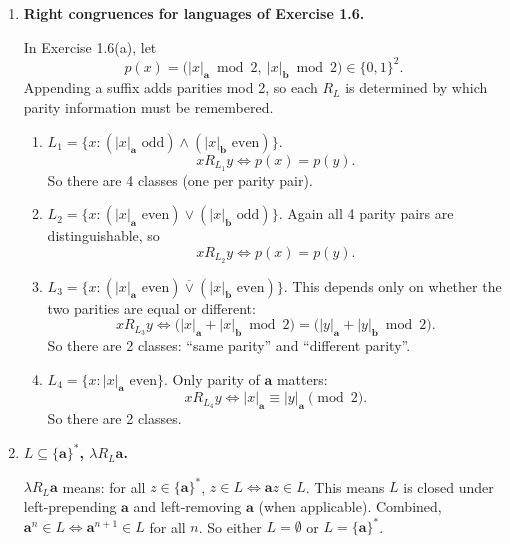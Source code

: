 \begin{enumerate}[{2.}1.]
Let the four $R^N$-classes from Example 2.6 be
\[
A_0=[\lambda],\quad A_1=[\mathbf{1}],\quad A_2=[\mathbf{11}],\quad A_3=[\mathbf{000}].
\]
Not every union of these classes preserves $R_L=R^N$; many choices collapse states.
The unions that keep all four classes pairwise Nerode-distinct are exactly:
\[
L=A_0\cup A_1,\quad
L=A_1\cup A_2,\quad
L=A_0\cup A_3,\quad
L=A_2\cup A_3.
\]
These are precisely the languages with $R_L=R^N$.

\item \textbf{Right congruences for languages of Exercise 1.6.}

In Exercise 1.6(a), let
\[
p(x)=\bigl(|x|_\mathbf a \bmod 2,\ |x|_\mathbf b \bmod 2\bigr)\in\{0,1\}^2.
\]
Appending a suffix adds parities mod 2, so each $R_L$ is determined by which
parity information must be remembered.

\begin{enumerate}
\item $L_1=\{x:(|x|_\mathbf a\text{ odd})\wedge(|x|_\mathbf b\text{ even})\}$.
\[
x R_{L_1} y \Longleftrightarrow p(x)=p(y).
\]
So there are 4 classes (one per parity pair).

\item $L_2=\{x:(|x|_\mathbf a\text{ even})\vee(|x|_\mathbf b\text{ odd})\}$.
Again all 4 parity pairs are distinguishable, so
\[
x R_{L_2} y \Longleftrightarrow p(x)=p(y).
\]

\item $L_3=\{x:(|x|_\mathbf a\text{ even})\overline{\vee}(|x|_\mathbf b\text{ even})\}$.
This depends only on whether the two parities are equal or different:
\[
x R_{L_3} y \Longleftrightarrow
\bigl(|x|_\mathbf a+|x|_\mathbf b\bmod2\bigr)=
\bigl(|y|_\mathbf a+|y|_\mathbf b\bmod2\bigr).
\]
So there are 2 classes: ``same parity'' and ``different parity''.

\item $L_4=\{x:|x|_\mathbf a\text{ even}\}$.
Only parity of $\mathbf a$ matters:
\[
x R_{L_4} y \Longleftrightarrow |x|_\mathbf a\equiv |y|_\mathbf a\pmod2.
\]
So there are 2 classes.
\end{enumerate}

\item \textbf{$L\subseteq\{\mathbf{a}\}^*$, $\lambda R_L \mathbf{a}$.}

$\lambda R_L \mathbf{a}$ means: for all $z\in\{\mathbf{a}\}^*$, $z\in L\Leftrightarrow\mathbf{a}z\in L$. This means $L$ is closed under left-prepending $\mathbf{a}$ and left-removing $\mathbf{a}$ (when applicable). Combined, $\mathbf{a}^n\in L\Leftrightarrow\mathbf{a}^{n+1}\in L$ for all $n$. So either $L=\emptyset$ or $L=\{\mathbf{a}\}^*$.


\end{enumerate}
